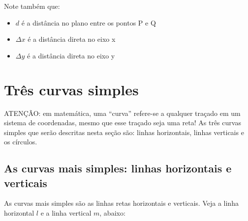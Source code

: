 \documentclass[pdftex, brazil, 12pt, twoside]{article}
\begin{document}
Note também que:

\begin{itemize}[noitemsep]
\item $d$ é a distância no plano entre os pontos P e Q
\item $\Delta x$ é a distância direta no eixo x
\item $\Delta y$ é a distância direta no eixo y
\end{itemize}


\section{Três curvas simples}
\label{tres-curvas}

ATENÇÃO: em matemática, uma ``curva'' refere-se a qualquer traçado em um sistema
de coordenadas, mesmo que esse traçado seja uma reta! As três curvas simples que
serão descritas nesta seção são: linhas horizontais, linhas verticais e os círculos.

\subsection{As curvas mais simples: linhas horizontais e verticais}
\label{tres-curvas-linhas-simples}

As curvas mais simples são as linhas retas horizontais e verticais. Veja a linha
horizontal $l$ e a linha vertical $m$, abaixo:
\end{document}
